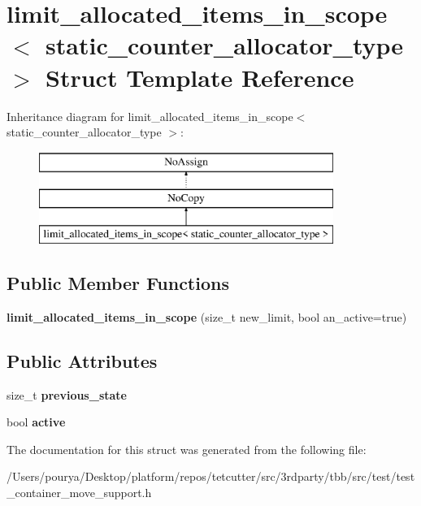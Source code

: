\hypertarget{structlimit__allocated__items__in__scope}{}\section{limit\+\_\+allocated\+\_\+items\+\_\+in\+\_\+scope$<$ static\+\_\+counter\+\_\+allocator\+\_\+type $>$ Struct Template Reference}
\label{structlimit__allocated__items__in__scope}
Inheritance diagram for limit\+\_\+allocated\+\_\+items\+\_\+in\+\_\+scope$<$ static\+\_\+counter\+\_\+allocator\+\_\+type $>$\+:\begin{figure}[H]
\begin{center}
\leavevmode
\includegraphics[height=3.000000cm]{structlimit__allocated__items__in__scope}
\end{center}
\end{figure}
\subsection*{Public Member Functions}
\begin{DoxyCompactItemize}
\item 
\hypertarget{structlimit__allocated__items__in__scope_aa532b3f74ac27b65912f1db5ce6570f6}{}{\bfseries limit\+\_\+allocated\+\_\+items\+\_\+in\+\_\+scope} (size\+\_\+t new\+\_\+limit, bool an\+\_\+active=true)\label{structlimit__allocated__items__in__scope_aa532b3f74ac27b65912f1db5ce6570f6}

\end{DoxyCompactItemize}
\subsection*{Public Attributes}
\begin{DoxyCompactItemize}
\item 
\hypertarget{structlimit__allocated__items__in__scope_a821a570a778a5016935f6f82591afe1d}{}size\+\_\+t {\bfseries previous\+\_\+state}\label{structlimit__allocated__items__in__scope_a821a570a778a5016935f6f82591afe1d}

\item 
\hypertarget{structlimit__allocated__items__in__scope_aaa19a03e475fd408d2dce62b65e3c062}{}bool {\bfseries active}\label{structlimit__allocated__items__in__scope_aaa19a03e475fd408d2dce62b65e3c062}

\end{DoxyCompactItemize}


The documentation for this struct was generated from the following file\+:\begin{DoxyCompactItemize}
\item 
/\+Users/pourya/\+Desktop/platform/repos/tetcutter/src/3rdparty/tbb/src/test/test\+\_\+container\+\_\+move\+\_\+support.\+h\end{DoxyCompactItemize}
